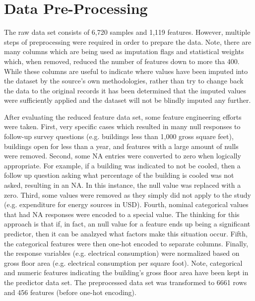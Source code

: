 {\section*{Data Pre-Processing}}

The raw data set consists of 6,720 samples and 1,119 features.  However, multiple steps of preprocessing were required in order to prepare the data.  Note, there are many columns which are being used as imputation flags and statistical weights which, when removed, reduced the number of features down to more tha 400.  While these columns are useful to indicate where values have been imputed into the dataset by the source's own methodologies, rather than try to change back the data to the original records it has been determined that the imputed values were sufficiently applied and the dataset will not be blindly imputed any further.

After evaluating the reduced feature data set, some feature engineering efforts were taken.  First, very specific cases which resulted in many null responses to follow-up survey questions (e.g. buildings less than 1,000 gross square feet), buildings open for less than a year, and features with a large amount of nulls were removed.  Second, some NA entries were converted to zero when logically appropriate.  For example, if a building was indicated to not be cooled, then a follow up question asking what percentage of the building is cooled was not asked, resulting in an NA.  In this instance, the null value was replaced with a zero.  Third, some values were removed as they simply did not apply to the study (e.g. expenditure for energy sources in USD).  Fourth, nominal categorical values that had NA responses were encoded to a special value.  The thinking for this approach is that if, in fact, an null value for a feature ends up being a significant predictor, then it can be analzyed what factors make this situation occur.  Fifth, the categorical features were then one-hot encoded to separate columns.  Finally, the response variables (e.g. electrical consumption) were normalized based on gross floor area (e.g. electrical consumption per square foot).  Note, categorical and numeric features indicating the building's gross floor area have been kept in the predictor data set.  The preprocessed data set was transformed to 6661 rows and 456 features (before one-hot encoding).